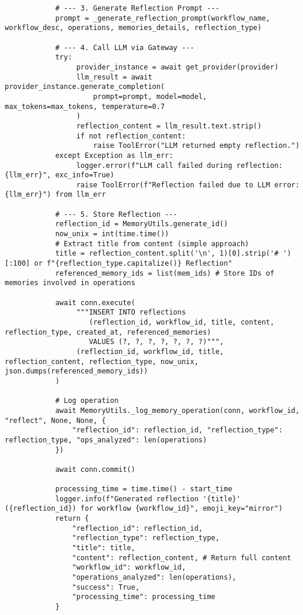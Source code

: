 \documentclass[12pt,a4paper]{article}
\begin{document}
\begin{pageablecode}
\begin{verbatim}
            # --- 3. Generate Reflection Prompt ---
            prompt = _generate_reflection_prompt(workflow_name, workflow_desc, operations, memories_details, reflection_type)

            # --- 4. Call LLM via Gateway ---
            try:
                 provider_instance = await get_provider(provider)
                 llm_result = await provider_instance.generate_completion(
                     prompt=prompt, model=model, max_tokens=max_tokens, temperature=0.7
                 )
                 reflection_content = llm_result.text.strip()
                 if not reflection_content: 
                     raise ToolError("LLM returned empty reflection.")
            except Exception as llm_err:
                 logger.error(f"LLM call failed during reflection: {llm_err}", exc_info=True)
                 raise ToolError(f"Reflection failed due to LLM error: {llm_err}") from llm_err

            # --- 5. Store Reflection ---
            reflection_id = MemoryUtils.generate_id()
            now_unix = int(time.time())
            # Extract title from content (simple approach)
            title = reflection_content.split('\n', 1)[0].strip('# ')[:100] or f"{reflection_type.capitalize()} Reflection"
            referenced_memory_ids = list(mem_ids) # Store IDs of memories involved in operations

            await conn.execute(
                 """INSERT INTO reflections
                    (reflection_id, workflow_id, title, content, reflection_type, created_at, referenced_memories)
                    VALUES (?, ?, ?, ?, ?, ?, ?)""",
                 (reflection_id, workflow_id, title, reflection_content, reflection_type, now_unix, json.dumps(referenced_memory_ids))
            )

            # Log operation
            await MemoryUtils._log_memory_operation(conn, workflow_id, "reflect", None, None, {
                "reflection_id": reflection_id, "reflection_type": reflection_type, "ops_analyzed": len(operations)
            })

            await conn.commit()

            processing_time = time.time() - start_time
            logger.info(f"Generated reflection '{title}' ({reflection_id}) for workflow {workflow_id}", emoji_key="mirror")
            return {
                "reflection_id": reflection_id,
                "reflection_type": reflection_type,
                "title": title,
                "content": reflection_content, # Return full content
                "workflow_id": workflow_id,
                "operations_analyzed": len(operations),
                "success": True,
                "processing_time": processing_time
            }


\end{verbatim}
\end{pageablecode}
\end{document}
